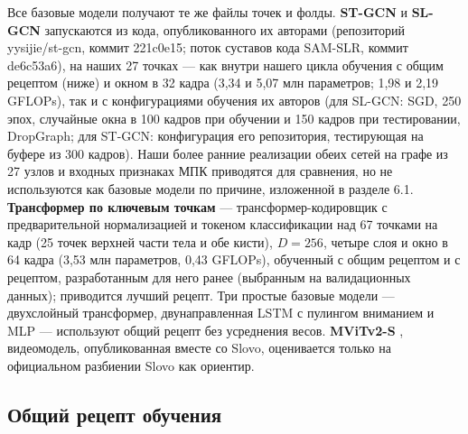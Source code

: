 Все базовые модели получают те же файлы точек и фолды. \textbf{ST-GCN} \citep{2018_yan_stgcn} и \textbf{SL-GCN} \citep{2021_jiang_sam_slr} запускаются из кода, опубликованного их авторами (репозиторий yysijie/st-gcn, коммит 221c0e15; поток суставов кода SAM-SLR, коммит de6c53a6), на наших 27 точках --- как внутри нашего цикла обучения с общим рецептом (ниже) и окном в 32 кадра (3,34 и 5,07 млн параметров; 1,98 и 2,19 GFLOPs), так и с конфигурациями обучения их авторов (для SL-GCN: SGD, 250 эпох, случайные окна в 100 кадров при обучении и 150 кадров при тестировании, DropGraph; для ST-GCN: конфигурация его репозитория, тестирующая на буфере из 300 кадров). Наши более ранние реализации обеих сетей на графе из 27 узлов и входных признаках МПК приводятся для сравнения, но не используются как базовые модели по причине, изложенной в разделе 6.1. \textbf{Трансформер по ключевым точкам} --- трансформер-кодировщик с предварительной нормализацией \citep{2017_vaswani_attention} и токеном классификации над 67 точками на кадр (25 точек верхней части тела и обе кисти), \(D = 256\), четыре слоя и окно в 64 кадра (3,53 млн параметров, 0,43 GFLOPs), обученный с общим рецептом и с рецептом, разработанным для него ранее (выбранным на валидационных данных); приводится лучший рецепт. Три простые базовые модели --- двухслойный трансформер, двунаправленная LSTM с пулингом вниманием и MLP --- используют общий рецепт без усреднения весов. \textbf{MViTv2-S} \citep{2022_li_mvitv2}, видеомодель, опубликованная вместе со Slovo, оценивается только на официальном разбиении Slovo как ориентир.

\hypertarget{ux43eux431ux449ux438ux439-ux440ux435ux446ux435ux43fux442-ux43eux431ux443ux447ux435ux43dux438ux44f}{%
\subsection{Общий рецепт обучения}\label{ux43eux431ux449ux438ux439-ux440ux435ux446ux435ux43fux442-ux43eux431ux443ux447ux435ux43dux438ux44f}}

